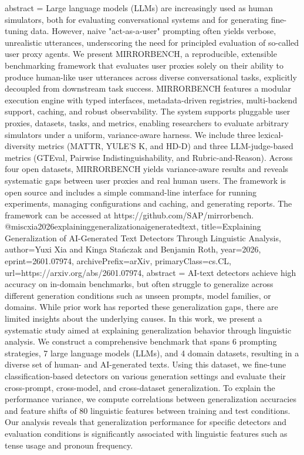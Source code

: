 {      abstract = {Large language models (LLMs) are increasingly used as human simulators, both for evaluating conversational systems and for generating fine-tuning data. However, naive "act-as-a-user" prompting often yields verbose, unrealistic utterances, underscoring the need for principled evaluation of so-called user proxy agents. We present MIRRORBENCH, a reproducible, extensible benchmarking framework that evaluates user proxies solely on their ability to produce human-like user utterances across diverse conversational tasks, explicitly decoupled from downstream task success. MIRRORBENCH features a modular execution engine with typed interfaces, metadata-driven registries, multi-backend support, caching, and robust observability. The system supports pluggable user proxies, datasets, tasks, and metrics, enabling researchers to evaluate arbitrary simulators under a uniform, variance-aware harness. We include three lexical-diversity metrics (MATTR, YULE'S K, and HD-D) and three LLM-judge-based metrics (GTEval, Pairwise Indistinguishability, and Rubric-and-Reason). Across four open datasets, MIRRORBENCH yields variance-aware results and reveals systematic gaps between user proxies and real human users. The framework is open source and includes a simple command-line interface for running experiments, managing configurations and caching, and generating reports. The framework can be accessed at https://github.com/SAP/mirrorbench.}
}@misc{xia2026explaininggeneralizationaigeneratedtext,
      title={Explaining Generalization of AI-Generated Text Detectors Through Linguistic Analysis}, 
      author={Yuxi Xia and Kinga Stańczak and Benjamin Roth},
      year={2026},
      eprint={2601.07974},
      archivePrefix={arXiv},
      primaryClass={cs.CL},
      url={https://arxiv.org/abs/2601.07974},
      abstract = {AI-text detectors achieve high accuracy on in-domain benchmarks, but often struggle to generalize across different generation conditions such as unseen prompts, model families, or domains. While prior work has reported these generalization gaps, there are limited insights about the underlying causes. In this work, we present a systematic study aimed at explaining generalization behavior through linguistic analysis. We construct a comprehensive benchmark that spans 6 prompting strategies, 7 large language models (LLMs), and 4 domain datasets, resulting in a diverse set of human- and AI-generated texts. Using this dataset, we fine-tune classification-based detectors on various generation settings and evaluate their cross-prompt, cross-model, and cross-dataset generalization. To explain the performance variance, we compute correlations between generalization accuracies and feature shifts of 80 linguistic features between training and test conditions. Our analysis reveals that generalization performance for specific detectors and evaluation conditions is significantly associated with linguistic features such as tense usage and pronoun frequency.}
}
